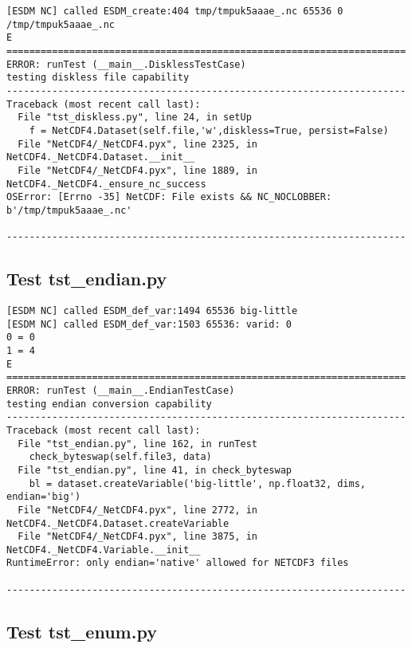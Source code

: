 \begin{verbatim}
[ESDM NC] called ESDM_create:404 tmp/tmpuk5aaae_.nc 65536 0 /tmp/tmpuk5aaae_.nc
E
======================================================================
ERROR: runTest (__main__.DisklessTestCase)
testing diskless file capability
----------------------------------------------------------------------
Traceback (most recent call last):
  File "tst_diskless.py", line 24, in setUp
    f = NetCDF4.Dataset(self.file,'w',diskless=True, persist=False)
  File "NetCDF4/_NetCDF4.pyx", line 2325, in NetCDF4._NetCDF4.Dataset.__init__
  File "NetCDF4/_NetCDF4.pyx", line 1889, in NetCDF4._NetCDF4._ensure_nc_success
OSError: [Errno -35] NetCDF: File exists && NC_NOCLOBBER: b'/tmp/tmpuk5aaae_.nc'

----------------------------------------------------------------------
\end{verbatim}

\subsection{Test tst\_endian.py}

\begin{verbatim}
[ESDM NC] called ESDM_def_var:1494 65536 big-little
[ESDM NC] called ESDM_def_var:1503 65536: varid: 0
0 = 0
1 = 4
E
======================================================================
ERROR: runTest (__main__.EndianTestCase)
testing endian conversion capability
----------------------------------------------------------------------
Traceback (most recent call last):
  File "tst_endian.py", line 162, in runTest
    check_byteswap(self.file3, data)
  File "tst_endian.py", line 41, in check_byteswap
    bl = dataset.createVariable('big-little', np.float32, dims, endian='big')
  File "NetCDF4/_NetCDF4.pyx", line 2772, in NetCDF4._NetCDF4.Dataset.createVariable
  File "NetCDF4/_NetCDF4.pyx", line 3875, in NetCDF4._NetCDF4.Variable.__init__
RuntimeError: only endian='native' allowed for NETCDF3 files

----------------------------------------------------------------------
\end{verbatim}

\subsection{Test tst\_enum.py}

